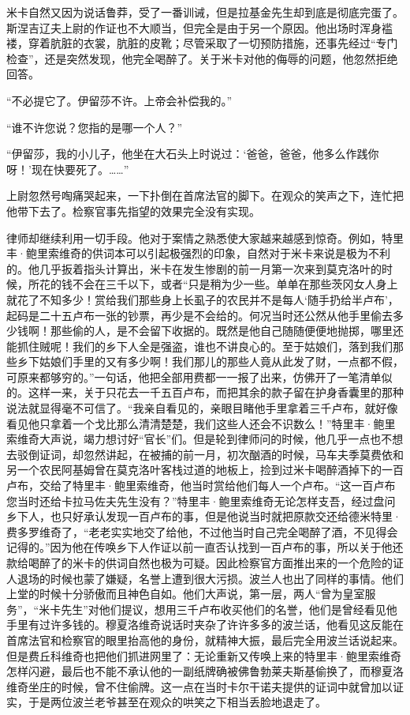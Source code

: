 \par 米卡自然又因为说话鲁莽，受了一番训诫，但是拉基金先生却到底是彻底完蛋了。斯涅吉辽夫上尉的作证也不大顺当，但完全是由于另一个原因。他出场时浑身褴褛，穿着肮脏的衣裳，肮脏的皮靴；尽管采取了一切预防措施，还事先经过“专门检查”，还是突然发现，他完全喝醉了。关于米卡对他的侮辱的问题，他忽然拒绝回答。
\par “不必提它了。伊留莎不许。上帝会补偿我的。”
\par “谁不许您说？您指的是哪一个人？”
\par “伊留莎，我的小儿子，他坐在大石头上时说过：‘爸爸，爸爸，他多么作践你呀！’现在快要死了。……”
\par 上尉忽然号啕痛哭起来，一下扑倒在首席法官的脚下。在观众的笑声之下，连忙把他带下去了。检察官事先指望的效果完全没有实现。
\par 律师却继续利用一切手段。他对于案情之熟悉使大家越来越感到惊奇。例如，特里丰·鲍里索维奇的供词本可以引起极强烈的印象，自然对于米卡来说是极为不利的。他几乎扳着指头计算出，米卡在发生惨剧的前一月第一次来到莫克洛叶的时候，所花的钱不会在三千以下，或者“只是稍为少一些。单单在那些茨冈女人身上就花了不知多少！赏给我们那些身上长虱子的农民并不是每人‘随手扔给半卢布’，起码是二十五卢布一张的钞票，再少是不会给的。何况当时还公然从他手里偷去多少钱啊！那些偷的人，是不会留下收据的。既然是他自己随随便便地抛掷，哪里还能抓住贼呢！我们的乡下人全是强盗，谁也不讲良心的。至于姑娘们，落到我们那些乡下姑娘们手里的又有多少啊！我们那儿的那些人竟从此发了财，一点都不假，可原来都够穷的。”一句话，他把全部用费都一一报了出来，仿佛开了一笔清单似的。这样一来，关于只花去一千五百卢布，而把其余的款子留在护身香囊里的那种说法就显得毫不可信了。“我亲自看见的，亲眼目睹他手里拿着三千卢布，就好像看见他只拿着一个戈比那么清清楚楚，我们这些人还会不识数么！”特里丰·鲍里索维奇大声说，竭力想讨好“官长”们。但是轮到律师问的时候，他几乎一点也不想去驳倒证词，却忽然讲起，在被捕的前一月，初次酗酒的时候，马车夫季莫费依和另一个农民阿基姆曾在莫克洛叶客栈过道的地板上，捡到过米卡喝醉酒掉下的一百卢布，交给了特里丰·鲍里索维奇，他当时赏给他们每人一个卢布。“这一百卢布您当时还给卡拉马佐夫先生没有？”特里丰·鲍里索维奇无论怎样支吾，经过盘问乡下人，也只好承认发现一百卢布的事，但是他说当时就把原款交还给德米特里·费多罗维奇了，“老老实实地交了给他，不过他当时自己完全喝醉了酒，不见得会记得的。”因为他在传唤乡下人作证以前一直否认找到一百卢布的事，所以关于他还款给喝醉了的米卡的供词自然也极为可疑。因此检察官方面推出来的一个危险的证人退场的时候也蒙了嫌疑，名誉上遭到很大污损。波兰人也出了同样的事情。他们上堂的时候十分骄傲而且神色自如。他们大声说，第一层，两人“曾为皇室服务”，“米卡先生”对他们提议，想用三千卢布收买他们的名誉，他们是曾经看见他手里有过许多钱的。穆夏洛维奇说话时夹杂了许许多多的波兰话，他看见这反能在首席法官和检察官的眼里抬高他的身份，就精神大振，最后完全用波兰话说起来。但是费丘科维奇也把他们抓进网里了：无论重新又传唤上来的特里丰·鲍里索维奇怎样闪避，最后也不能不承认他的一副纸牌确被佛鲁勃莱夫斯基偷换了，而穆夏洛维奇坐庄的时候，曾不住偷牌。这一点在当时卡尔干诺夫提供的证词中就曾加以证实，于是两位波兰老爷甚至在观众的哄笑之下相当丢脸地退走了。
